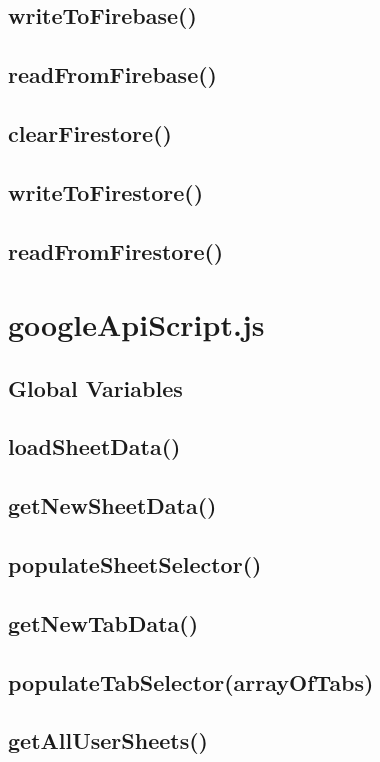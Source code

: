\documentclass[letterpaper]{article}
\begin{document}
\subsection{writeToFirebase()}
\subsection{readFromFirebase()}
\subsection{clearFirestore()}
\subsection{writeToFirestore()}
\subsection{readFromFirestore()}

\newpage

\section{googleApiScript.js}

\subsection{Global Variables}
\subsection{loadSheetData()}
\subsection{getNewSheetData()}
\subsection{populateSheetSelector()}
\subsection{getNewTabData()}
\subsection{populateTabSelector(arrayOfTabs)}
\subsection{getAllUserSheets()}
\end{document}
